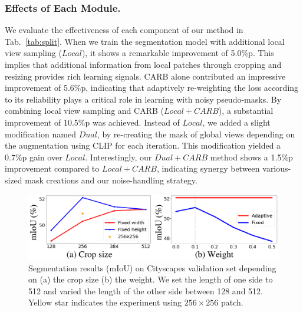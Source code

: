 \documentclass[letterpaper]{article} %
\begin{document}
\subsubsection{Effects of Each Module.} We evaluate the effectiveness of each component of our method in Tab.~\ref{tab:split}. When we train the segmentation model with additional local view sampling ($Local$), it shows a remarkable improvement of 5.0\%p. This implies that additional information from local patches through cropping and resizing provides rich learning signals. CARB alone contributed an impressive improvement of 5.6\%p, indicating that adaptively re-weighting the loss according to its reliability plays a critical role in learning with noisy pseudo-masks. By combining local view sampling and CARB ($Local + CARB$), a substantial improvement of 10.5\%p was achieved. Instead of $Local$, we added a slight modification named $Dual$, by re-creating the mask of global views depending on the augmentation using CLIP for each iteration. This modification yielded a 0.7\%p gain over $Local$. Interestingly, our $Dual+CARB$ method shows a 1.5\%p improvement compared to $Local + CARB$, indicating synergy between various-sized mask creations and our noise-handling strategy. 

\begin{figure}[t]
\begin{center}
\includegraphics[width=\linewidth]{figures/fig_ablation.pdf}
\end{center}
\caption{Segmentation results (mIoU) on Cityscapes validation set depending on (a) the crop size (b) the weight. We set the length of one side to 512 and varied the length of the other side between 128 and 512. Yellow star indicates the experiment using $256 \times 256$ patch.}
\label{fig:ablation}
\end{figure}
\end{document}
